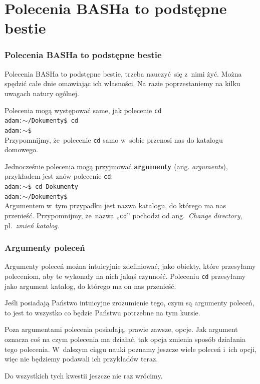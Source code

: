 \documentclass[10pt,t]{beamer}
\begin{document}
\section{Polecenia BASHa to podstępne bestie}


\begin{frame}
  \frametitle{Polecenia BASHa to podstępne bestie}


  Polecenia BASHa to podstępne bestie, trzeba nauczyć~się z~nimi żyć.
  Można spędzić całe dnie omawiając ich własności. Na razie poprzestaniemy
  na kilku uwagach natury ogólnej.

  Polecenia mogą występować same, jak polecenie \texttt{cd} \\
  \texttt{adam:$\sim$/Dokumenty\$ cd} \\
  \texttt{adam:$\sim$\$} \\
  Przypomnijmy, że~polecenie \texttt{cd} samo w~sobie przenosi nas do
  katalogu domowego.

  Jednocześnie polecenia mogą przyjmować \textbf{argumenty}
  (ang. \textit{arguments}), przykładem jest znów polecenie \texttt{cd}: \\
  \texttt{adam:$\sim$\$ cd Dokumenty} \\
  \texttt{adam:$\sim$/Dokumenty\$} \\
  Argumentem w~tym przypadku jest nazwa katalogu, do którego ma nas
  przenieść. Przypomnijmy, że~nazwa „\texttt{cd}” pochodzi od
  ang.~\textit{Change directory}, pl.~\textit{zmień katalog}.

\end{frame}





\begin{frame}
  \frametitle{Argumenty poleceń}


  Argumenty poleceń można intuicyjnie zdefiniować, jako obiekty, które
  przesyłamy poleceniom, aby te wykonały na nich jakąś czynność. Poleceniu
  \texttt{cd} przesyłamy jako argument katalog, do którego ma on nas
  przenieść.

  Jeśli posiadają Państwo intuicyjne zrozumienie tego, czym są argumenty
  poleceń, to jest to wszystko co będzie Państwu potrzebne na tym kursie.

  Poza argumentami polecenia posiadają, prawie zawsze, opcje. Jak argument
  oznacza coś na czym polecenia ma działać, tak opcja zmienia sposób
  działania tego polecenia. W~dalszym ciągu nauki poznamy jeszcze wiele
  poleceń i~ich opcji, więc nie będziemy podawali ich przykładów teraz.

  Do wszystkich tych kwestii jeszcze nie raz wrócimy.

\end{frame}
\end{document}
